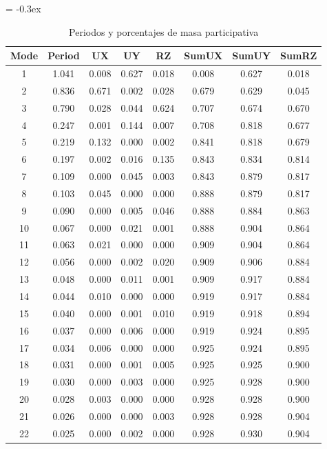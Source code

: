 \documentclass{article}%
\begin{document}
\begin{table}[H]%
\extrarowheight = -0.3ex%
\renewcommand{\arraystretch}{1.3}%
\centering%
\caption{Periodos y porcentajes de masa participativa}%
\begin{tabular}{cccccccc}
\toprule
Mode & Period & UX & UY & RZ & SumUX & SumUY & SumRZ \\
\midrule
1 & 1.041 & 0.008 & 0.627 & 0.018 & 0.008 & 0.627 & 0.018 \\
2 & 0.836 & 0.671 & 0.002 & 0.028 & 0.679 & 0.629 & 0.045 \\
3 & 0.790 & 0.028 & 0.044 & 0.624 & 0.707 & 0.674 & 0.670 \\
4 & 0.247 & 0.001 & 0.144 & 0.007 & 0.708 & 0.818 & 0.677 \\
5 & 0.219 & 0.132 & 0.000 & 0.002 & 0.841 & 0.818 & 0.679 \\
6 & 0.197 & 0.002 & 0.016 & 0.135 & 0.843 & 0.834 & 0.814 \\
7 & 0.109 & 0.000 & 0.045 & 0.003 & 0.843 & 0.879 & 0.817 \\
8 & 0.103 & 0.045 & 0.000 & 0.000 & 0.888 & 0.879 & 0.817 \\
9 & 0.090 & 0.000 & 0.005 & 0.046 & 0.888 & 0.884 & 0.863 \\
10 & 0.067 & 0.000 & 0.021 & 0.001 & 0.888 & 0.904 & 0.864 \\
11 & 0.063 & 0.021 & 0.000 & 0.000 & 0.909 & 0.904 & 0.864 \\
12 & 0.056 & 0.000 & 0.002 & 0.020 & 0.909 & 0.906 & 0.884 \\
13 & 0.048 & 0.000 & 0.011 & 0.001 & 0.909 & 0.917 & 0.884 \\
14 & 0.044 & 0.010 & 0.000 & 0.000 & 0.919 & 0.917 & 0.884 \\
15 & 0.040 & 0.000 & 0.001 & 0.010 & 0.919 & 0.918 & 0.894 \\
16 & 0.037 & 0.000 & 0.006 & 0.000 & 0.919 & 0.924 & 0.895 \\
17 & 0.034 & 0.006 & 0.000 & 0.000 & 0.925 & 0.924 & 0.895 \\
18 & 0.031 & 0.000 & 0.001 & 0.005 & 0.925 & 0.925 & 0.900 \\
19 & 0.030 & 0.000 & 0.003 & 0.000 & 0.925 & 0.928 & 0.900 \\
20 & 0.028 & 0.003 & 0.000 & 0.000 & 0.928 & 0.928 & 0.900 \\
21 & 0.026 & 0.000 & 0.000 & 0.003 & 0.928 & 0.928 & 0.904 \\
22 & 0.025 & 0.000 & 0.002 & 0.000 & 0.928 & 0.930 & 0.904 \\

\end{tabular}
\end{table}
\end{document}
